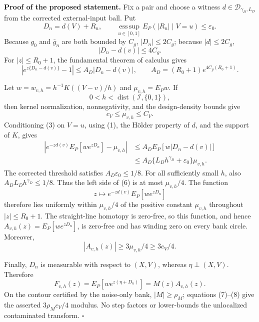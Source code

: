 \textbf{Proof of the proposed statement.}
Fix a pair and choose a witness \(d\in\mathcal D_{\gamma_D,L_D}\) from the corrected external-input ball. Put
\[
 D_n=d(V)+R_n,\qquad
 \operatorname*{ess\,sup}_{u\in[0,1]}E_P(|R_n|\mid V=u)
 \le\varepsilon_0. \tag{1}
\]
Because \(g_0\) and \(\bar g_n\) are both bounded by \(C_g\), \(|D_n|\le2C_g\); because \(|d|\le2C_g\),
\[
 |D_n-d(v)|\le4C_g. \tag{2}
\]
For \(|z|\le R_0+1\), the fundamental theorem of calculus gives
\[
 |e^{z\{D_n-d(v)\}}-1|
 \le A_D|D_n-d(v)|,\qquad
 A_D=(R_0+1)e^{4C_g(R_0+1)}. \tag{3}
\]

Let \(w=w_{v,h}=h^{-1}K((V-v)/h)\) and \(\mu_{v,h}=E_Pw\). If
\[
 0<h<\operatorname{dist}(\mathcal I,\{0,1\}), \tag{4}
\]
then kernel normalization, nonnegativity, and the design-density bounds give
\[
 c_V\le\mu_{v,h}\le C_V. \tag{5}
\]
Conditioning (3) on \(V=u\), using (1), the H\"older property of \(d\), and the support of \(K\), gives
\[
\begin{aligned}
 \left|e^{-zd(v)}E_P[we^{zD_n}]-\mu_{v,h}\right|
 &\le A_DE_P[w|D_n-d(v)|]\\
 &\le A_D\{L_Dh^{\gamma_D}+\varepsilon_0\}\mu_{v,h}. \tag{6}
\end{aligned}
\]
The corrected threshold satisfies \(A_D\varepsilon_0\le1/8\). For all sufficiently small \(h\), also \(A_DL_Dh^{\gamma_D}\le1/8\). Thus the left side of (6) is at most \(\mu_{v,h}/4\). The function
\[
 z\longmapsto e^{-zd(v)}E_P[we^{zD_n}]
\]
therefore lies uniformly within \(\mu_{v,h}/4\) of the positive constant \(\mu_{v,h}\) throughout \(|z|\le R_0+1\). The straight-line homotopy is zero-free, so this function, and hence \(A_{v,h}(z)=E_P[we^{zD_n}]\), is zero-free and has winding zero on every bank circle. Moreover,
\[
 |A_{v,h}(z)|\ge3\mu_{v,h}/4\ge3c_V/4. \tag{7}
\]

Finally, \(D_n\) is measurable with respect to \((X,V)\), whereas \(\eta\perp(X,V)\). Therefore
\[
 F_{v,h}(z)=E_P[we^{z(\eta+D_n)}]
 =M(z)A_{v,h}(z). \tag{8}
\]
On the contour certified by the noise-only bank, \(|M|\ge\rho_M\); equations (7)--(8) give the asserted \(3\rho_Mc_V/4\) modulus. No step factors or lower-bounds the unlocalized contaminated transform. \(\square\)